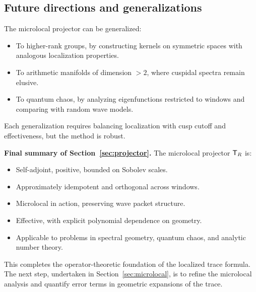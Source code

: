 \subsection{Future directions and generalizations}\label{subsec:proj-future}

The microlocal projector can be generalized:
\begin{itemize}
\item To higher-rank groups, by constructing kernels on symmetric spaces with analogous localization properties.
\item To arithmetic manifolds of dimension $>2$, where cuspidal spectra remain elusive.
\item To quantum chaos, by analyzing eigenfunctions restricted to windows and comparing with random wave models.
\end{itemize}
Each generalization requires balancing localization with cusp cutoff and effectiveness, but the method is robust.

\bigskip
\noindent\textbf{Final summary of Section~\ref{sec:projector}.} The microlocal projector $\mathsf{T}_R$ is:
\begin{itemize}
\item Self-adjoint, positive, bounded on Sobolev scales.
\item Approximately idempotent and orthogonal across windows.
\item Microlocal in action, preserving wave packet structure.
\item Effective, with explicit polynomial dependence on geometry.
\item Applicable to problems in spectral geometry, quantum chaos, and analytic number theory.
\end{itemize}

This completes the operator-theoretic foundation of the localized trace formula. The next step, undertaken in Section~\ref{sec:microlocal}, is to refine the microlocal analysis and quantify error terms in geometric expansions of the trace.
